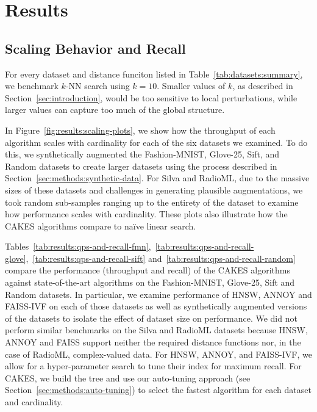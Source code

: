 \section{Results}
\label{sec:results}


\subsection{Scaling Behavior and Recall}
\label{sec:results:scaling-behavior-and-recall}

For every dataset and distance funciton listed in Table~\ref{tab:datasets:summary}, we benchmark $k$-NN search using $k=10$.
Smaller values of $k$, as described in Section~\ref{sec:introduction}, would be too sensitive to local perturbations, while larger values can capture too much of the global structure.

In Figure~\ref{fig:results:scaling-plots}, we show how the throughput of each algorithm scales with cardinality for each of the six datasets we examined.
To do this, we synthetically augmented the Fashion-MNIST, Glove-25, Sift, and Random datasets to create larger datasets using the process described in Section~\ref{sec:methods:synthetic-data}.
For Silva and RadioML, due to the massive sizes of these datasets and challenges in generating plausible augmentations, we took random sub-samples ranging up to the entirety of the dataset to examine how performance scales with cardinality.
These plots also illustrate how the CAKES algorithms compare to na\"{i}ve linear search. 

Tables~\ref{tab:results:qps-and-recall-fmn},~\ref{tab:results:qps-and-recall-glove},~\ref{tab:results:qps-and-recall-sift} and~\ref{tab:results:qps-and-recall-random} compare the performance (throughput and recall) of the CAKES algorithms against state-of-the-art algorithms on the Fashion-MNIST, Glove-25, Sift and Random datasets.
In particular, we examine performance of HNSW, ANNOY and FAISS-IVF on each of those datasets as well as synthetically augmented versions of the datasets to isolate the effect of dataset size on performance.
We did not perform similar benchmarks on the Silva and RadioML datasets because HNSW, ANNOY and FAISS support neither the required distance functions nor, in the case of RadioML, complex-valued data.
For HNSW, ANNOY, and FAISS-IVF, we allow for a hyper-parameter search to tune their index for maximum recall.
For CAKES, we build the tree and use our auto-tuning approach (see Section~\ref{sec:methods:auto-tuning}) to select the fastest algorithm for each dataset and cardinality.

